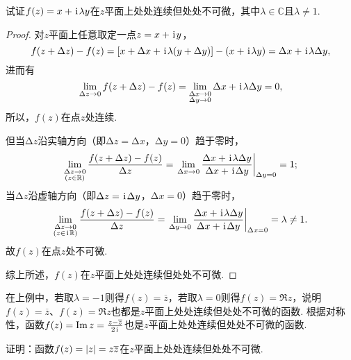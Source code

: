 \begin{example}
试证\(f(z)=x+\kern1pt\mathrm{i}\kern1pt \lambda y\)在\(z\)平面上处处连续但处处不可微，其中\(\lambda \in \mathbb{C}\)且\(\lambda \neq 1\).
\begin{proof}
对\(z\)平面上任意取定一点\(z=x+\kern1pt\mathrm{i}\kern1pt y\)，\[
f(z+\Delta z)-f(z) = [x + \Delta x + \kern1pt\mathrm{i}\kern1pt \lambda (y + \Delta y)] - (x + \kern1pt\mathrm{i}\kern1pt \lambda y) = \Delta x + \kern1pt\mathrm{i}\kern1pt \lambda \Delta y,
\]进而有\[
\lim\limits_{\Delta z\to0} f(z+\Delta z)-f(z)
= \lim\limits_{\substack{\Delta x\to0 \\ \Delta y\to0}} \Delta x + \kern1pt\mathrm{i}\kern1pt \lambda \Delta y
= 0,
\]所以，\(f(z)\)在点\(z\)处连续.

但当\(\increment z\)沿实轴方向（即\(\increment z = \increment x\)，\(\increment y = 0\)）趋于零时，\[
\lim\limits_{\substack{\increment z\to0 \\ (z \in \mathbb{R})}} \frac{f(z+\increment z)-f(z)}{\increment z}
= \eval{\lim\limits_{\increment x\to0} \frac{\increment x + \iu \lambda \increment y}{\increment x + \iu \increment y}}_{\increment y = 0} = 1;
\]当\(\increment z\)沿虚轴方向（即\(\Delta z = \kern1pt\mathrm{i}\kern1pt \Delta y\)，\(\increment x = 0\)）趋于零时，\[
\lim\limits_{\substack{\increment z\to0 \\ (z \in \iu \mathbb{R})}} \frac{f(z+\increment z)-f(z)}{\increment z}
= \eval{\lim\limits_{\increment y\to0} \frac{\increment x + \iu \lambda \increment y}{\increment x + \iu \increment y}}_{\increment x = 0} = \lambda \neq 1.
\]故\(f(z)\)在点\(z\)处不可微.

综上所述，\(f(z)\)在\(z\)平面上处处连续但处处不可微.
\end{proof}
\end{example}
在上例中，若取\(\lambda=-1\)则得\(f(z) = \overline{z}\)，若取\(\lambda=0\)则得\(f(z) = \Re z\)，说明\(f(z) = \overline{z}\)、\(f(z) = \Re z\)也都是\(z\)平面上处处连续但处处不可微的函数.
根据对称性，函数\(f(z) = \Im z = \frac{z - \overline{z}}{2\kern1pt\mathrm{i}\kern1pt}\)也是\(z\)平面上处处连续但处处不可微的函数.

\begin{example}
证明：函数\(f(z) = \abs{z} = z \overline{z}\)在\(z\)平面上处处连续但处处不可微.
\end{example}

